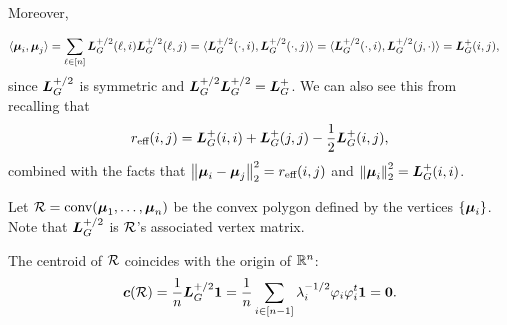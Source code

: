 Moreover,

\begin{align*}
    \langle \vb*{\mu}_i,\vb*{\mu}_j\rangle &=\sum_{\ell\in[n]} \vb*{L}_G^{+/2}(\ell,i)\vb*{L}_G^{+/2}(\ell,j) = \langle \vb*{L}_G^{+/2}(\cdot,i),\vb*{L}_G^{+/2}(\cdot,j)\rangle =\langle \vb*{L}_G^{+/2}(\cdot,i),\vb*{L}_G^{+/2}(j,\cdot)\rangle= \vb*{L}_G^+(i,j),
\end{align*}
since $\vb*{L}_G^{+/2}$ is symmetric and  $\vb*{L}_G^{+/2}\vb*{L}_G^{+/2}=\vb*{L}_G^+$.  We can also see this from recalling that 
\[r_{\text{eff}}(i,j) = \vb*{L}_G^+(i,i) + \vb*{L}_G^+(j,j) - \frac{1}{2}\vb*{L}_G^+(i,j),\]
combined with the facts that $\norm{\vb*{\mu}_i-\vb*{\mu}_j}_2^2 = r_{\text{eff}}(i,j)$ and $\norm{\vb*{\mu}_i}_2^2 = \vb*{L}_G^+(i,i)$. 




Let $\mathcal{R}=\textnormal{conv}(\vb*{\mu}_1,\dots,\vb*{\mu}_n)$ be the convex polygon defined by the vertices $\{\vb*{\mu}_i\}$.  Note that $\vb*{L}_G^{+/2}$ is $\mathcal{R}$'s associated vertex matrix. 

The centroid of $\mathcal{R}$ coincides with the origin  of $\mathbb{R}^n$: 
\begin{equation*}
    \vb*{c}(\mathcal{R}) = \frac{1}{n}\vb*{L}_G^{+/2}\vb{1} = \frac{1}{n}\sum_{i\in[n-1]}\lambda_i^{-1/2}\varphi_i\varphi_i^t \vb{1} = \vb{0}.
\end{equation*}

